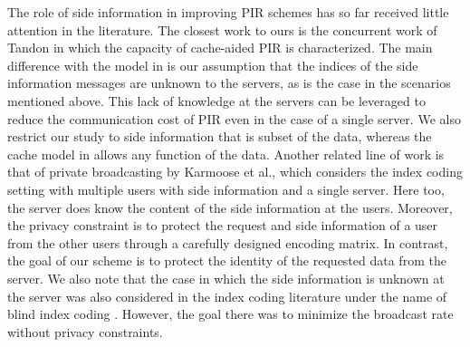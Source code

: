 \documentclass[letterpaper, 10 pt, conference]{ieeeconf}
\newcommand\alexn[1]{\notee[alex]{#1}}
\begin{document}
The role of side information in improving PIR schemes has so far received little attention in the literature. The closest work to ours is the concurrent work  of Tandon \cite{Tandon2017} in which the capacity of  {cache-aided PIR} is characterized. The main difference with the model in \cite{Tandon2017} is our assumption that the indices of the side information messages are unknown to  the servers, as is the case in the scenarios mentioned above. This lack of knowledge at the servers can be leveraged to reduce the communication cost of PIR even in the case of a single server. We also restrict our study to side information that is subset of the data, whereas the cache model in \cite{Tandon2017} allows any function of the data.  Another related line of work is that of {private broadcasting} by Karmoose et al.\cite{Karmoose2017}, which considers the index coding setting with multiple users with side information and a single server. Here too, the server does know the content of the side information at the users. Moreover, the privacy constraint  is to protect the request and side information of a user from the other users through a carefully designed encoding matrix. In contrast, the goal of our scheme is to protect the identity of the requested data from the server. We also note that the case in which the side information is unknown at the server was also considered in the index coding literature under the name of  {blind index coding} \cite{kao2017blind}. However, the goal there was to minimize the broadcast rate without privacy constraints. 


\end{document}
